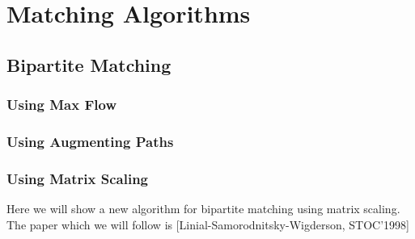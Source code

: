 \chapter{Matching Algorithms}
\section{Bipartite Matching}
\subsection{Using Max Flow}
\subsection{Using Augmenting Paths}
\subsection{Using Matrix Scaling}
Here we will show a new algorithm for bipartite matching using matrix scaling. The paper which we will follow is  [Linial-Samorodnitsky-Wigderson, STOC'1998]\parinn

